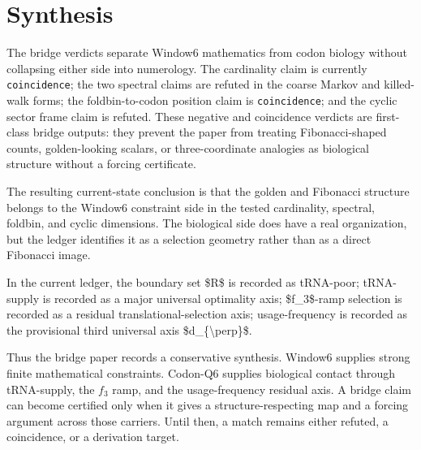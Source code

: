 \section{Synthesis}
The bridge verdicts separate Window6 mathematics from codon biology without
collapsing either side into numerology.  The cardinality claim is currently
\texttt{coincidence}; the two spectral
claims are refuted in the coarse Markov and killed-walk forms; the foldbin-to-codon
position claim is \texttt{coincidence};
and the cyclic sector frame claim is refuted.  These negative and coincidence
verdicts are first-class bridge outputs: they prevent the paper from treating
Fibonacci-shaped counts, golden-looking scalars, or three-coordinate analogies as
biological structure without a forcing certificate.

The resulting current-state conclusion is that the golden and Fibonacci structure
belongs to the Window6 constraint side in the tested cardinality, spectral, foldbin,
and cyclic dimensions.  The biological side does have a real organization, but the
ledger identifies it as a selection geometry rather than as a direct Fibonacci image.

In the current ledger, the boundary set \$R\$ is recorded as tRNA-poor; tRNA-supply is recorded as a major universal optimality axis; \$f\_3\$-ramp selection is recorded as a residual translational-selection axis; usage-frequency is recorded as the provisional third universal axis \$d\_\{\textbackslash{}perp\}\$.

Thus the bridge paper records a conservative synthesis.  Window6 supplies strong
finite mathematical constraints.  Codon-Q6 supplies biological contact through
tRNA-supply, the $f_3$ ramp, and the usage-frequency residual axis.  A bridge claim
can become certified only when it gives a structure-respecting map and a forcing
argument across those carriers.  Until then, a match remains either refuted, a
coincidence, or a derivation target.
